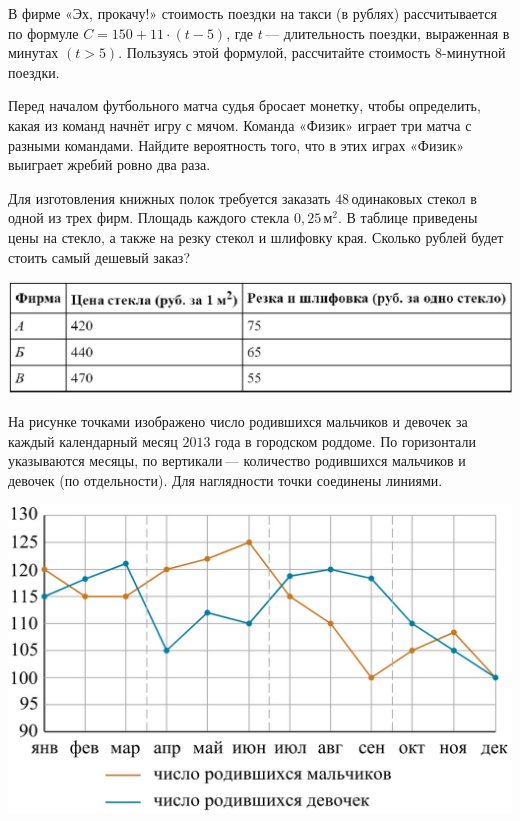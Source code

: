 \begin{homework}[number=3]
\begin{listofex}
\begin{minipage}[t]{0.45\linewidth}
		\end{minipage}
		\item В фирме «Эх, прокачу!» стоимость поездки на такси (в рублях) рассчитывается по формуле \(C=150+11\cdot (t-5)\), где \(t\) --- длительность поездки, выраженная в минутах \((t>5)\). Пользуясь этой формулой, рассчитайте стоимость \(8\)-минутной поездки.
		\item Перед началом футбольного матча судья бросает монетку, чтобы определить, какая из команд начнёт игру с мячом. Команда «Физик» играет три матча с разными командами. Найдите вероятность того, что в этих играх «Физик» выиграет жребий ровно два раза.
		\item 
		\begin{minipage}[t]{\linewidth}
			Для изготовления книжных полок требуется заказать \(48\) одинаковых стекол в одной из трех фирм. Площадь каждого стекла \(0,25\) м\(^2\). В таблице приведены цены на стекло, а также на резку стекол и шлифовку края. Сколько рублей будет стоить самый дешевый заказ?
		\end{minipage}
		\hspace{0.02\linewidth}
		\begin{minipage}[t]{\linewidth}
			\includegraphics[align=t, width=\linewidth]{../pics/G101M8H3-6}
		\end{minipage}
		\item 
		\begin{minipage}[t]{0.46\linewidth}
			На рисунке точками изображено число родившихся мальчиков и девочек за каждый календарный месяц \(2013\) года в городском роддоме. По горизонтали указываются месяцы, по вертикали --- количество родившихся мальчиков и девочек (по отдельности). Для наглядности точки соединены линиями.
		\end{minipage}
		\hspace{0.02\linewidth}
		\begin{minipage}[t]{0.5\linewidth}
			\includegraphics[align=t, width=\linewidth]{../pics/G101M8H3-7}

\end{minipage}
\end{listofex}
\end{homework}
